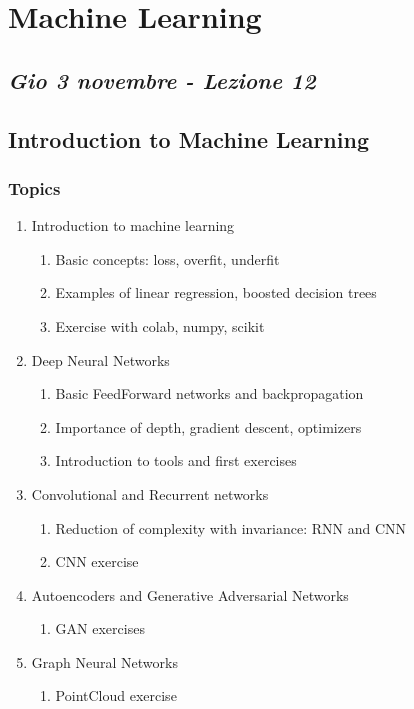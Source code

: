 \chapter{Machine Learning}

\section{\textit{Gio 3 novembre - Lezione 12}}
\section{Introduction to Machine Learning}

\subsection{Topics}

\begin{enumerate}
	\item Introduction to machine learning
		\begin{enumerate}
			\item Basic concepts: loss, overfit, underfit
			\item Examples of linear regression, boosted decision trees
			\item Exercise with colab, numpy, scikit
		\end{enumerate}
	\item Deep Neural Networks
			\begin{enumerate}
			\item Basic FeedForward networks and backpropagation
			\item Importance of depth, gradient descent, optimizers
			\item Introduction to tools and first exercises
			\end{enumerate}
	\item Convolutional and Recurrent networks
		\begin{enumerate}
			\item Reduction of complexity with invariance: RNN and CNN
			\item CNN exercise
		\end{enumerate}
	\item Autoencoders and Generative Adversarial Networks
		\begin{enumerate}
			\item GAN exercises
		\end{enumerate}
	\item Graph Neural Networks
		\begin{enumerate}
			\item PointCloud exercise
		\end{enumerate}
\end{enumerate}

